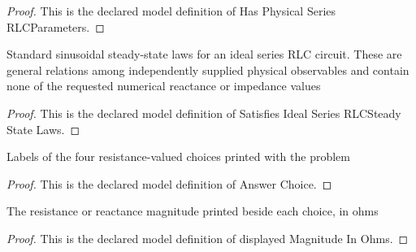 \begin{proof}
  This is the declared model definition of Has Physical Series RLCParameters.
\end{proof}
\begin{definition}
  \label{def:physics:phyx-mini-0943:phyxminiproblems-problemphyxmini0943-satisfiesidealseriesrlcsteadystatelaws}
  Standard sinusoidal steady-state laws for an ideal series RLC circuit. These are general relations among independently supplied physical observables and contain none of the requested numerical reactance or impedance values
\end{definition}
\begin{proof}
  This is the declared model definition of Satisfies Ideal Series RLCSteady State Laws.
\end{proof}
\begin{definition}
  \label{def:physics:phyx-mini-0943:phyxminiproblems-problemphyxmini0943-answerchoice}
  Labels of the four resistance-valued choices printed with the problem
\end{definition}
\begin{proof}
  This is the declared model definition of Answer Choice.
\end{proof}
\begin{definition}
  \label{def:physics:phyx-mini-0943:phyxminiproblems-problemphyxmini0943-answerchoice-displayedmagnitudeinohms}
  The resistance or reactance magnitude printed beside each choice, in ohms
\end{definition}
\begin{proof}
  This is the declared model definition of displayed Magnitude In Ohms.
\end{proof}
